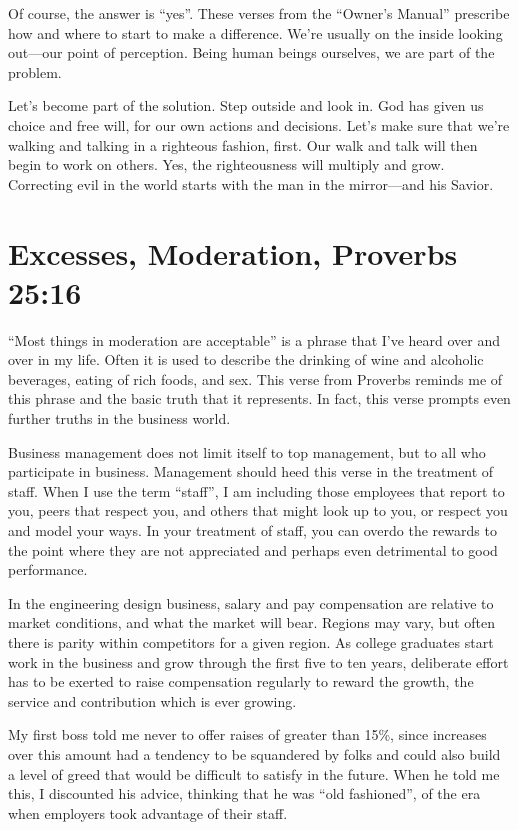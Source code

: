 \documentclass[12pt]{memoir}
\begin{document}
Of course, the answer is ``yes''. These verses from the ``Owner's Manual'' prescribe how and where to start to make a difference. We're usually on the inside looking out---our point of perception. Being human
beings ourselves, we are part of the problem. 

Let's become part of
the solution. Step outside and look in. God has given us choice and
free will, for our own actions and decisions. Let's make sure that
we're walking and talking in a righteous fashion, first. Our walk and talk will then begin to work on others. Yes, the righteousness
will multiply and grow. Correcting evil in the world starts with the
man in the mirror---and his Savior.

\section[Excesses, Moderation]{Excesses, Moderation, Proverbs 25:16}

``Most things in moderation are acceptable'' is a phrase that I've
heard over and over in my life. Often it is used to describe the
drinking of wine and alcoholic beverages, eating of rich foods, and
sex. This verse from Proverbs reminds me of this phrase and the basic
truth that it represents. In fact, this verse prompts even further truths in the business world.

Business management does not limit itself to top management,
but to all who participate in business. Management should heed this verse in
the treatment of staff. When I use the term ``staff'', I am including
those employees that report to you, peers that respect you, and others
that might look up to you, or respect you and model your ways. In your treatment of staff, you can overdo the rewards to the point where
they are not appreciated and perhaps even detrimental to good performance.

In the engineering design business, salary and pay compensation are
relative to market conditions, and what the market will bear. Regions
may vary, but often there is parity within competitors for a given
region. As college graduates start work in the business and grow
through the first five to ten years, deliberate effort has to be exerted
to raise compensation regularly to reward the growth, the service
and contribution which is ever growing.

My first boss told me never to offer raises of greater than 15\%, since increases over this
amount had a tendency to be squandered by folks and could also build
a level of greed that would be difficult to satisfy in the future.
When he told me this, I discounted his advice, thinking that he was
``old fashioned'', of the era when employers took advantage of their
staff.
\end{document}
